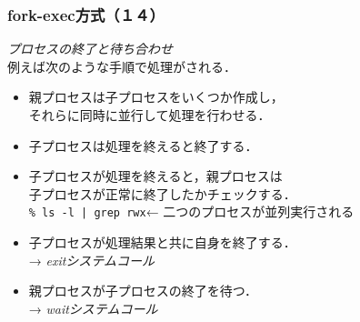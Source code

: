 \documentclass{beamer}                 %
\begin{document}
\begin{frame}[fragile]
  \frametitle{fork-exec方式（１４）}
  \emph{プロセスの終了と待ち合わせ}\\
  \vfill
  例えば次のような手順で処理がされる．
  \begin{itemize}
  \item 親プロセスは子プロセスをいくつか作成し，\\
    それらに同時に並行して処理を行わせる．
  \item 子プロセスは処理を終えると終了する．
  \item 子プロセスが処理を終えると，親プロセスは \\
    子プロセスが正常に終了したかチェックする．\\
    \vfill
    \verb;% ls -l | grep rwx;\hfil ←  \hfil 二つのプロセスが並列実行される
    \vfill
  \item 子プロセスが処理結果と共に自身を終了する． \\
    → \emph{exitシステムコール}
  \item 親プロセスが子プロセスの終了を待つ． \\
    → \emph{waitシステムコール}
  \end{itemize}
\end{frame}
\end{document}
